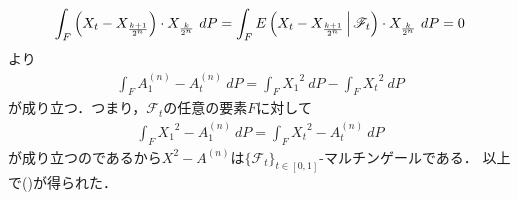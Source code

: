 \begin{sketch}
\begin{description}
\begin{align}
					\int_{F} \left( X_{t} - X_{\frac{k+1}{2^{n}}} \right) \cdot X_{\frac{k}{2^{n}}}\ dP
					= \int_{F} E\left( X_{t} - X_{\frac{k+1}{2^{n}}} \, \middle|\, \mathscr{F}_{t} \right) \cdot X_{\frac{k}{2^{n}}}\ dP
					= 0
				\end{align}
				より
				\begin{align}
					\int_{F} A^{(n)}_{1} - A^{(n)}_{t}\ dP = \int_{F} {X_{1}}^{2}\ dP - \int_{F} {X_{t}}^{2}\ dP
				\end{align}
				が成り立つ．つまり，$\mathscr{F}_{t}$の任意の要素$F$に対して
				\begin{align}
					\int_{F} {X_{1}}^{2} - A^{(n)}_{1}\ dP = \int_{F} {X_{t}}^{2} - A^{(n)}_{t}\ dP
				\end{align}
				が成り立つのであるから$X^{2} - A^{(n)}$は$\{\mathscr{F}_{t}\}_{t \in [0,1]}$-マルチンゲールである．
				以上で()が得られた．
				

\end{description}
\end{sketch}
